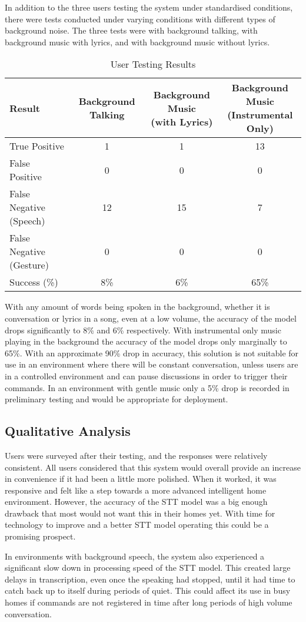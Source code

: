 In addition to the three users testing the system under standardised conditions, there were tests conducted under varying conditions with different types of background noise.
The three tests were with background talking, with background music with lyrics, and with background music without lyrics.

\begin{table}[h!]
    \centering
    \begin{tabular}{|l|c|c|c|}
        \hline
        Result & Background Talking & \makecell{Background Music \\ (with Lyrics)} & \makecell{Background Music \\ (Instrumental Only)} \\ \hline
        True Positive & 1 & 1 & 13 \\ \hline
        False Positive & 0 & 0 & 0 \\ \hline
        False Negative (Speech) & 12 & 15 & 7 \\ \hline
        False Negative (Gesture) & 0 & 0 & 0 \\ \hline
        Success (\%) & 8\% & 6\% & 65\% \\ \hline
    \end{tabular}
    \caption{User Testing Results}
    \label{tab:background_test_results}
\end{table}

With any amount of words being spoken in the background, whether it is conversation or lyrics in a song, even at a low volume, the accuracy of the model drops significantly to 8\% and 6\% respectively.
With instrumental only music playing in the background the accuracy of the model drops only marginally to 65\%.
With an approximate 90\% drop in accuracy, this solution is not suitable for use in an environment where there will be constant conversation, unless users are in a controlled environment and can pause discussions in order to trigger their commands.
In an environment with gentle music only a 5\% drop is recorded in preliminary testing and would be appropriate for deployment.

\subsection{Qualitative Analysis}
Users were surveyed after their testing, and the responses were relatively consistent.
All users considered that this system would overall provide an increase in convenience if it had been a little more polished.
When it worked, it was responsive and felt like a step towards a more advanced intelligent home environment.
However, the accuracy of the STT model was a big enough drawback that most would not want this in their homes yet.
With time for technology to improve and a better STT model operating this could be a promising prospect.

In environments with background speech, the system also experienced a significant slow down in processing speed of the STT model.
This created large delays in transcription, even once the speaking had stopped, until it had time to catch back up to itself during periods of quiet.
This could affect its use in busy homes if commands are not registered in time after long periods of high volume conversation.